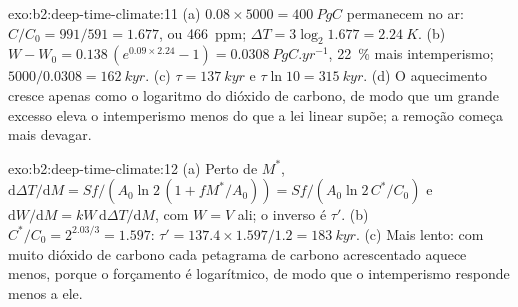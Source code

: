 \begin{solution}{exo:b2:deep-time-climate:11}
(a) $0.08\times5000 = \qty{400}{PgC}$ permanecem no ar: $C/C_0 = 991/591 = 1.677$, ou
\qty{466}{ppm}; $\Delta T = 3\log_2 1.677 = \qty{2.24}{K}$. (b) $W - W_0 = 0.138\,(e^{0.09\times2.24}
- 1) = \qty{0.0308}{PgC.yr^{-1}}$, \qty{22}{\percent} mais intemperismo; $5000/0.0308 =
\qty{162}{kyr}$. (c) $\tau = \qty{137}{kyr}$ e $\tau\ln10 = \qty{315}{kyr}$. (d) O aquecimento cresce
apenas como o logaritmo do dióxido de carbono, de modo que um grande excesso eleva o intemperismo menos do que a
lei linear supõe; a remoção começa mais devagar.
\end{solution}

\begin{solution}{exo:b2:deep-time-climate:12}
(a) Perto de $M^*$, $\mathrm d\Delta T/\mathrm dM = Sf/(A_0\ln 2\,(1 + fM^*/A_0)) = Sf/(A_0\ln 2\,
C^*/C_0)$ e $\mathrm dW/\mathrm dM = kW\,\mathrm d\Delta T/\mathrm dM$, com $W = V$ ali; o
inverso é $\tau'$. (b) $C^*/C_0 = 2^{2.03/3} = 1.597$: $\tau' = 137.4\times1.597/1.2 =
\qty{183}{kyr}$. (c) Mais lento: com muito dióxido de carbono cada petagrama de carbono acrescentado aquece menos,
porque o forçamento é logarítmico, de modo que o intemperismo responde menos a ele.
\end{solution}

